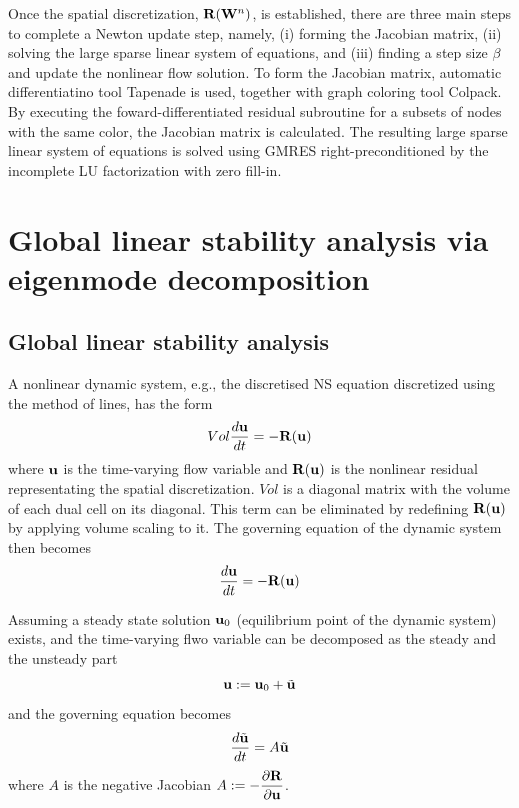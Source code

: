 \documentclass[journal,final]{new-aiaa}
\begin{document}
Once the spatial discretization,  $\mathbf{R}(\mathbf{W}^n)$, is established,
there are three main steps to complete a Newton update step,
namely, (i) forming the Jacobian matrix, (ii)
solving the large sparse linear system of equations,
and (iii) finding a step size $\beta$ and update the nonlinear
flow solution.
To form the Jacobian matrix, automatic differentiatino tool Tapenade
is used, together with graph coloring tool Colpack. By executing the
foward-differentiated residual subroutine for a subsets of nodes
with the same color, the Jacobian matrix is calculated. The resulting
large sparse linear system of equations is solved using GMRES
right-preconditioned by the incomplete LU factorization with zero
fill-in. 



\section{Global linear stability analysis via eigenmode decomposition}
\subsection{Global linear stability analysis}
A nonlinear dynamic system, e.g., the discretised NS equation discretized
using the method of lines,
has the form
\begin{equation*}
Vol \dfrac{d\mathbf{u}}{dt}=-\mathbf{R}(\mathbf{u})
\end{equation*}
where $\mathbf{u}$ is the time-varying flow variable and $\mathbf{R}(\mathbf{u})$ is the nonlinear
residual representating the spatial discretization.
$Vol$ is a diagonal matrix with the volume of each dual cell on its diagonal.
This term can be eliminated by redefining $\mathbf{R}(\mathbf{u})$ by applying volume
scaling to it. The governing equation of the dynamic system then becomes
\begin{equation*}
\dfrac{d\mathbf{u}}{dt}=-\mathbf{R}(\mathbf{u})
\end{equation*}

Assuming a steady state solution $\mathbf{u}_0$ (equilibrium point of the dynamic system)
exists, and the time-varying flwo variable can be decomposed as the
steady and the unsteady part 
\begin{equation*}
\mathbf{u}:=\mathbf{u}_0 + \tilde {\mathbf{u}}
\end{equation*}
and the governing equation becomes
\begin{equation*}
\dfrac{d \tilde {\mathbf{u}}}{dt}=A \tilde {\mathbf{u}}
\end{equation*}
where $A$ is the negative Jacobian $A:=-\dfrac{\partial\mathbf{R}}{\partial\mathbf{u}}$.
\end{document}
